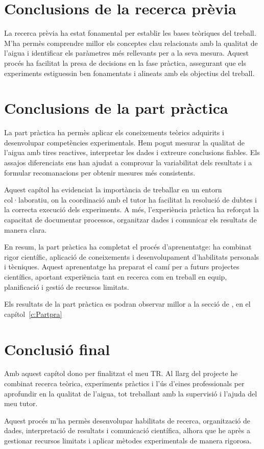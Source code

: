 \section{Conclusions de la recerca prèvia}

La recerca prèvia ha estat fonamental per establir les bases teòriques del treball. M'ha permès comprendre millor els conceptes clau relacionats amb la qualitat de l’aigua i identificar els paràmetres més rellevants per a la seva mesura. Aquest procés ha facilitat la presa de decisions en la fase pràctica, assegurant que els experiments estiguessin ben fonamentats i alineats amb els objectius del treball.



\section{Conclusions de la part pràctica}

La part pràctica ha permès aplicar els coneixements teòrics adquirits i desenvolupar competències experimentals. Hem pogut mesurar la qualitat de l’aigua amb tires reactives, interpretar les dades i extreure conclusions fiables. Els assajos diferenciats ens han ajudat a comprovar la variabilitat dels resultats i a formular recomanacions per obtenir mesures més consistents.

Aquest capítol ha evidenciat la importància de treballar en un entorn col·laboratiu, on la coordinació amb el tutor ha facilitat la resolució de dubtes i la correcta execució dels experiments. A més, l’experiència pràctica ha reforçat la capacitat de documentar processos, organitzar dades i comunicar els resultats de manera clara.

En resum, la part pràctica ha completat el procés d’aprenentatge: ha combinat rigor científic, aplicació de coneixements i desenvolupament d’habilitats personals i tècniques. Aquest aprenentatge ha preparat el camí per a futurs projectes científics, aportant experiència tant en recerca com en treball en equip, planificació i gestió de recursos limitats.

Els resultats de la part pràctica es podran observar millor a la secció de , en el capítol~\ref{c:Partpra}~
\section{Conclusió final}
Amb aquest capítol dono per finalitzat el meu TR. Al llarg del projecte he combinat recerca teòrica, experiments pràctics i l’ús d’eines professionals per aprofundir en la qualitat de l’aigua, tot treballant amb la supervisió i l’ajuda del meu tutor.

Aquest procés m’ha permès desenvolupar habilitats de recerca, organització de dades, interpretació de resultats i comunicació científica, alhora que he après a gestionar recursos limitats i aplicar mètodes experimentals de manera rigorosa.


